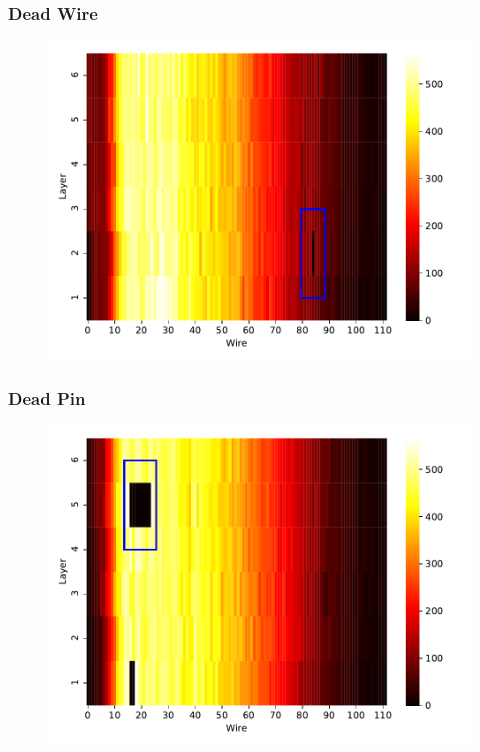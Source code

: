 \begin{frame}
  \frametitle{Dead Wire}
  \begin{figure}
    \includegraphics[width=.85\textwidth]{../figures/dead_wire}
  \end{figure}
\end{frame}

\begin{frame}
  \frametitle{Dead Pin}
  \begin{figure}
    \includegraphics[width=.85\textwidth]{../figures/dead_pin}
  \end{figure}
\end{frame}

